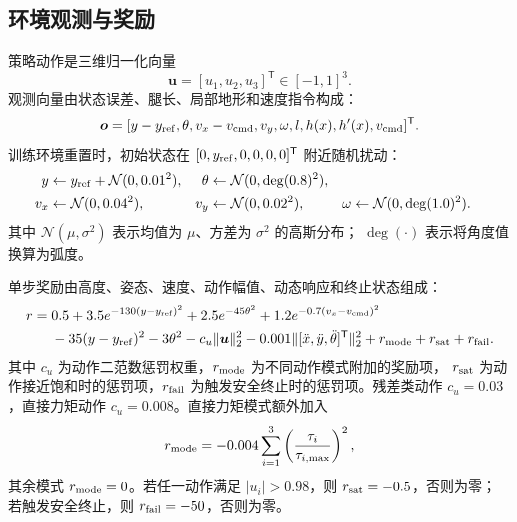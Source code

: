 \documentclass[UTF8,12pt,a4paper,fontset=none]{ctexart}
\begin{document}
\subsection{环境观测与奖励}
策略动作是三维归一化向量
\begin{equation}
\bm u=[u_1,u_2,u_3]^{\mathsf T}\in[-1,1]^3.
\end{equation}
观测向量由状态误差、腿长、局部地形和速度指令构成：
\begin{equation}
\bm o=[y-y_{\rm ref},\theta,v_x-v_{\rm cmd},v_y,\omega,l,h(x),h'(x),v_{\rm cmd}]^{\mathsf T}.
\end{equation}
训练环境重置时，初始状态在 $[0,y_{\rm ref},0,0,0,0]^{\mathsf T}$ 附近随机扰动：
\begin{align}
y&\leftarrow y_{\rm ref}+\mathcal N(0,0.01^2),&
\theta&\leftarrow \mathcal N(0,\operatorname{deg}(0.8)^2),\\
v_x&\leftarrow \mathcal N(0,0.04^2),&
v_y&\leftarrow \mathcal N(0,0.02^2),&
\omega&\leftarrow \mathcal N(0,\operatorname{deg}(1.0)^2).
\end{align}
其中 $\mathcal N(\mu,\sigma^2)$ 表示均值为 $\mu$、方差为 $\sigma^2$ 的高斯分布；
$\operatorname{deg}(\cdot)$ 表示将角度值换算为弧度。

单步奖励由高度、姿态、速度、动作幅值、动态响应和终止状态组成：
\begin{align}
r={}&0.5
+3.5e^{-130(y-y_{\rm ref})^2}
+2.5e^{-45\theta^2}
+1.2e^{-0.7(v_x-v_{\rm cmd})^2}\nonumber\\
&-35(y-y_{\rm ref})^2
-3\theta^2
-c_u\|\bm u\|_2^2
-0.001\|[\ddot x,\ddot y,\ddot\theta]^{\mathsf T}\|_2^2
+r_{\rm mode}+r_{\rm sat}+r_{\rm fail}.
\end{align}
其中 $c_u$ 为动作二范数惩罚权重，$r_{\rm mode}$ 为不同动作模式附加的奖励项，
$r_{\rm sat}$ 为动作接近饱和时的惩罚项，$r_{\rm fail}$ 为触发安全终止时的惩罚项。残差类动作
$c_u=0.03$，直接力矩动作 $c_u=0.008$。直接力矩模式额外加入
\begin{equation}
r_{\rm mode}=-0.004\sum_{i=1}^{3}\left(\frac{\tau_i}{\tau_{i,\max}}\right)^2,
\end{equation}
其余模式 $r_{\rm mode}=0$。若任一动作满足 $|u_i|>0.98$，则 $r_{\rm sat}=-0.5$，否则为零；
若触发安全终止，则 $r_{\rm fail}=-50$，否则为零。
\end{document}
